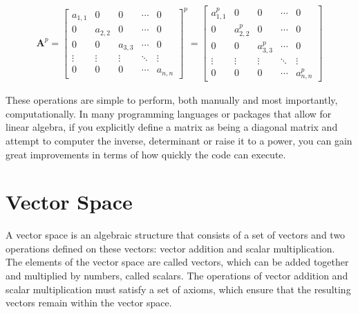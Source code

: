 \documentclass[12pt]{book}
\begin{document}
	\begin{align}
		\bm{A}^p = \begin{bmatrix}
			a_{1,1} & 0 & 0 & \cdots & 0 \\
			0 & a_{2,2} & 0 & \cdots & 0 \\
			0 & 0 & a_{3,3} & \cdots & 0 \\
			\vdots & \vdots & \vdots & \ddots & \vdots \\
			0 & 0 & 0 & \cdots & a_{n,n}
		\end{bmatrix}^p = \begin{bmatrix}
			a_{1,1}^p & 0 & 0 & \cdots & 0 \\
			0 & a_{2,2}^p & 0 & \cdots & 0 \\
			0 & 0 & a_{3,3}^p & \cdots & 0 \\
			\vdots & \vdots & \vdots & \ddots & \vdots \\
			0 & 0 & 0 & \cdots & a_{n,n}^p
		\end{bmatrix}
	\end{align}
	
	These operations are simple to perform, both manually and most importantly, computationally. In many programming languages or packages that allow for linear algebra, if you explicitly define a matrix as being a diagonal matrix and attempt to computer the inverse, determinant or raise it to a power, you can gain great improvements in terms of how quickly the code can execute.
	
	\section{Vector Space}
	A vector space is an algebraic structure that consists of a set of vectors and two operations defined on these vectors: vector addition and scalar multiplication. The elements of the vector space are called vectors, which can be added together and multiplied by numbers, called scalars. The operations of vector addition and scalar multiplication must satisfy a set of axioms, which ensure that the resulting vectors remain within the vector space. 
	
\end{document}
